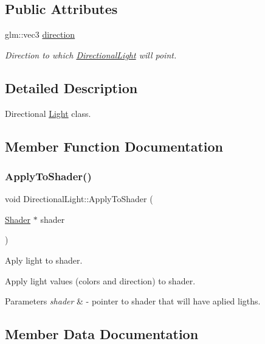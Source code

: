 \subsection*{Public Attributes}
\begin{DoxyCompactItemize}
\item 
glm\+::vec3 \mbox{\hyperlink{class_directional_light_a5b2956fd8583e5ef45fbf1f1e778cd39}{direction}}
\begin{DoxyCompactList}\small\item\em Direction to which \mbox{\hyperlink{class_directional_light}{Directional\+Light}} will point. \end{DoxyCompactList}\end{DoxyCompactItemize}


\subsection{Detailed Description}
Directional \mbox{\hyperlink{class_light}{Light}} class. 

\subsection{Member Function Documentation}
\mbox{\label{class_directional_light_a258c15fc957f8ffb76161dc000830418}} 
\subsubsection{\texorpdfstring{ApplyToShader()}{ApplyToShader()}}
{\footnotesize\ttfamily void Directional\+Light\+::\+Apply\+To\+Shader (\begin{DoxyParamCaption}\item[{\mbox{\hyperlink{class_shader}{Shader}} $\ast$}]{shader }\end{DoxyParamCaption})}



Aply light to shader. 

Apply light values (colors and direction) to shader. 
\begin{DoxyParams}{Parameters}
{\em shader} & -\/ pointer to shader that will have aplied ligths. \\
\hline
\end{DoxyParams}


\subsection{Member Data Documentation}
\mbox{\label{class_directional_light_a5b2956fd8583e5ef45fbf1f1e778cd39}} 
